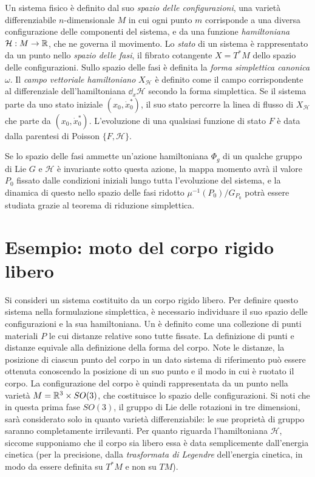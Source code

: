 Un sistema fisico è definito dal suo \emph{spazio delle configurazioni}, una varietà differenziabile $n$-dimensionale $M$ in cui ogni punto $m$ corrisponde a una diversa configurazione delle componenti del sistema, e da una funzione \emph{hamiltoniana} $\mathcal{H}: M\to \mathbb{R}$, che ne governa il movimento. Lo \emph{stato} di un sistema è rappresentato da un punto nello \emph{spazio delle fasi}, il fibrato cotangente $X = T^* M$ dello spazio delle configurazioni. Sullo spazio delle fasi è definita la \emph{forma simplettica canonica} $\omega$. Il \emph{campo vettoriale hamiltoniano} $X_{\mathcal{H}}$ è definito come il campo corrispondente al differenziale dell'hamiltoniana $\dd_{x}{\mathcal{H}}$ secondo la forma simplettica. Se il sistema parte da uno stato iniziale $(x_0, \dot{x}^*_0)$, il suo stato percorre la linea di flusso di $X_{\mathcal{H}}$ che parte da $(x_0, \dot{x}^*_0)$. L'evoluzione di una qualsiasi funzione di stato $F$ è data dalla parentesi di Poisson $\{F, \mathcal{H}\}$.

Se lo spazio delle fasi ammette un'azione hamiltoniana $\Phi_g$ di un qualche gruppo di Lie $G$ e $\mathcal{H}$ è invariante sotto questa azione, la mappa momento avrà il valore $P_0$ fissato dalle condizioni iniziali lungo tutta l'evoluzione del sistema, e la dinamica di questo nello spazio delle fasi ridotto $\mu^{-1}(P_0)/G_{P_0}$ potrà essere studiata grazie al teorema di riduzione simplettica. 

\section{Esempio: moto del corpo rigido libero}
Si consideri un sistema costituito da un corpo rigido libero. Per definire questo sistema nella formulazione simplettica, è necessario individuare il suo spazio delle configurazioni e la sua hamiltoniana. Un  è definito come una collezione di punti materiali $P$ le cui distanze relative sono tutte fissate. La definizione di punti e distanze equivale alla definizione della forma del corpo. Note le distanze, la posizione di ciascun punto del corpo in un dato sistema di riferimento può essere ottenuta conoscendo la posizione di un suo punto e il modo in cui è ruotato il corpo. La configurazione del corpo è quindi rappresentata da un punto nella varietà $M = \mathbb{R}^3 \times SO(3)$, che costituisce lo spazio delle configurazioni. Si noti che in questa prima fase $SO(3)$, il gruppo di Lie delle rotazioni in tre dimensioni, sarà considerato solo in quanto varietà differenziabile: le sue proprietà di gruppo saranno completamente irrilevanti. Per quanto riguarda l'hamiltoniana $\mathcal{H}$, siccome supponiamo che il corpo sia libero essa è data semplicemente dall'energia cinetica (per la precisione, dalla \emph{trasformata di Legendre} dell'energia cinetica, in modo da essere definita su $T^*M$ e non su $TM$). 


